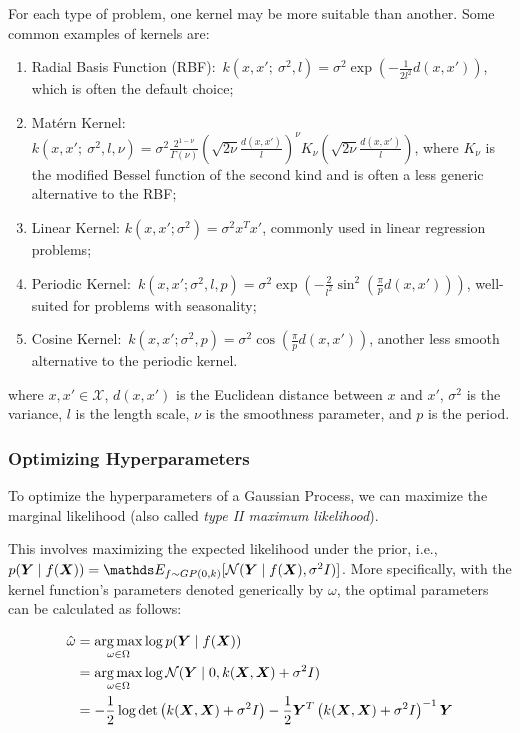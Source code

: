 For each type of problem, one kernel may be more suitable than another. Some common examples of kernels are:

\begin{enumerate}
\item Radial Basis Function (RBF):\ \( k(x, x';\ \sigma^2, l) = \sigma^2 \exp(-\frac{1}{2l^2}d(x,x')) \), which is often the default choice;
\item Matérn Kernel:\ \( k(x, x';\ \sigma^2, l, \nu) = \sigma^2 \frac{2^{1-\nu}}{\Gamma(\nu)}(\sqrt{2\nu}\frac{d(x, x')}{l})^\nu K_\nu(\sqrt{2\nu}\frac{d(x, x')}{l}) \), where \( K_\nu \) is the modified Bessel function of the second kind and is often a less generic alternative to the RBF;
\item Linear Kernel: \( k(x, x'; \sigma^2) = \sigma^2 x^Tx' \), commonly used in linear regression problems;
\item Periodic Kernel:\ \( k(x, x'; \sigma^2, l, p) = \sigma^2 \exp(-\frac{2}{l^2}\sin^2(\frac{\pi}{p}d(x, x'))) \), well-suited for problems with seasonality;
\item Cosine Kernel:\ \( k(x, x'; \sigma^2, p) = \sigma^2 \cos(\frac{\pi}{p}d(x, x')) \), another less smooth alternative to the periodic kernel.
\end{enumerate}

where \( x, x' \in \mathcal{X} \), \( d(x, x') \) is the Euclidean distance between \( x \) and \( x' \), \( \sigma^2 \) is the variance, \( l \) is the length scale, \( \nu \) is the smoothness parameter, and \( p \) is the period.

\subsubsection{Optimizing Hyperparameters}

To optimize the hyperparameters of a Gaussian Process, we can maximize the marginal likelihood (also called \textit{type II maximum likelihood}).

This involves maximizing the expected likelihood under the prior, i.e., \( p(\bfY \mid f(\bfX)) = \bE_{f \sim GP(0,k)}[\mathcal{N}(\bfY \mid f(\bfX), \sigma^2 I)] \). More specifically, with the kernel function's parameters denoted generically by \( \omega \), the optimal parameters can be calculated as follows:

\begin{align}
\hat{\omega} &= \underset{\omega \in \Omega}{\arg \max} \log p(\boldsymbol{Y} \mid f(\boldsymbol{X})) \nonumber \\
&= \underset{\omega \in \Omega}{\arg \max} \log \mathcal{N}(\boldsymbol{Y} \mid 0, k(\boldsymbol{X}, \boldsymbol{X}) + \sigma^2 I) \nonumber \\
&= -\frac{1}{2} \log \det \left( k(\boldsymbol{X}, \boldsymbol{X}) + \sigma^2 I \right) - \frac{1}{2} \boldsymbol{Y}^T \left( k(\boldsymbol{X}, \boldsymbol{X}) + \sigma^2 I \right)^{-1} \boldsymbol{Y} \label{eq:kernel_optimization}
\end{align}

